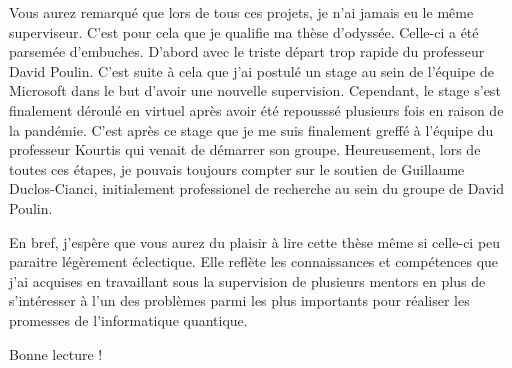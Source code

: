 Vous aurez remarqué que lors de tous ces projets,
je n'ai jamais eu le même superviseur.
C'est pour cela que je qualifie ma thèse d'odyssée.
Celle-ci a été parsemée d'embuches.
D'abord avec le triste départ trop rapide du professeur David Poulin.
C'est suite à cela que j'ai postulé un stage au sein de l'équipe de Microsoft
dans le but d'avoir une nouvelle supervision.
Cependant, le stage s'est finalement déroulé en virtuel après avoir été repousssé
plusieurs fois en raison de la pandémie.
C'est après ce stage que je me suis finalement greffé à l'équipe du professeur Kourtis 
qui venait de démarrer son groupe.
Heureusement,
lors de toutes ces étapes, 
je pouvais toujours compter sur le soutien de Guillaume Duclos-Cianci,
initialement professionel de recherche au sein du groupe de David Poulin.

En bref,
j'espère que vous aurez du plaisir à lire cette thèse même si celle-ci 
peu paraitre légèrement éclectique.
Elle reflète les connaissances et compétences que j'ai acquises en travaillant sous 
la supervision de plusieurs mentors en plus de s'intéresser à l'un des problèmes
parmi les plus importants pour réaliser les promesses de l'informatique quantique.

Bonne lecture !

